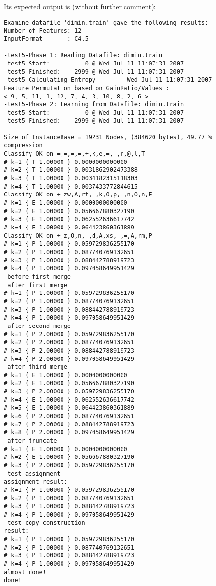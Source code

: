 \documentclass{report}
\begin{document}
Its expected output is (without further comment):

\begin{footnotesize}
\begin{verbatim}
Examine datafile 'dimin.train' gave the following results:
Number of Features: 12
InputFormat       : C4.5

-test5-Phase 1: Reading Datafile: dimin.train
-test5-Start:          0 @ Wed Jul 11 11:07:31 2007
-test5-Finished:    2999 @ Wed Jul 11 11:07:31 2007
-test5-Calculating Entropy         Wed Jul 11 11:07:31 2007
Feature Permutation based on GainRatio/Values :
< 9, 5, 11, 1, 12, 7, 4, 3, 10, 8, 2, 6 >
-test5-Phase 2: Learning from Datafile: dimin.train
-test5-Start:          0 @ Wed Jul 11 11:07:31 2007
-test5-Finished:    2999 @ Wed Jul 11 11:07:31 2007

Size of InstanceBase = 19231 Nodes, (384620 bytes), 49.77 % compression
Classify OK on =,=,=,=,+,k,e,=,-,r,@,l,T
# k=1 { T 1.00000 } 0.0000000000000
# k=2 { T 1.00000 } 0.0031862902473388
# k=3 { T 1.00000 } 0.0034182315118303
# k=4 { T 1.00000 } 0.0037433772844615
Classify OK on +,zw,A,rt,-,k,O,p,-,n,O,n,E
# k=1 { E 1.00000 } 0.0000000000000
# k=2 { E 1.00000 } 0.056667880327190
# k=3 { E 1.00000 } 0.062552636617742
# k=4 { E 1.00000 } 0.064423860361889
Classify OK on +,z,O,n,-,d,A,xs,-,=,A,rm,P
# k=1 { P 1.00000 } 0.059729836255170
# k=2 { P 1.00000 } 0.087740769132651
# k=3 { P 1.00000 } 0.088442788919723
# k=4 { P 1.00000 } 0.097058649951429
 before first merge 
 after first merge 
# k=1 { P 1.00000 } 0.059729836255170
# k=2 { P 1.00000 } 0.087740769132651
# k=3 { P 1.00000 } 0.088442788919723
# k=4 { P 1.00000 } 0.097058649951429
 after second merge 
# k=1 { P 2.00000 } 0.059729836255170
# k=2 { P 2.00000 } 0.087740769132651
# k=3 { P 2.00000 } 0.088442788919723
# k=4 { P 2.00000 } 0.097058649951429
 after third merge 
# k=1 { E 1.00000 } 0.0000000000000
# k=2 { E 1.00000 } 0.056667880327190
# k=3 { P 2.00000 } 0.059729836255170
# k=4 { E 1.00000 } 0.062552636617742
# k=5 { E 1.00000 } 0.064423860361889
# k=6 { P 2.00000 } 0.087740769132651
# k=7 { P 2.00000 } 0.088442788919723
# k=8 { P 2.00000 } 0.097058649951429
 after truncate 
# k=1 { E 1.00000 } 0.0000000000000
# k=2 { E 1.00000 } 0.056667880327190
# k=3 { P 2.00000 } 0.059729836255170
 test assignment
assignment result: 
# k=1 { P 1.00000 } 0.059729836255170
# k=2 { P 1.00000 } 0.087740769132651
# k=3 { P 1.00000 } 0.088442788919723
# k=4 { P 1.00000 } 0.097058649951429
 test copy construction
result: 
# k=1 { P 1.00000 } 0.059729836255170
# k=2 { P 1.00000 } 0.087740769132651
# k=3 { P 1.00000 } 0.088442788919723
# k=4 { P 1.00000 } 0.097058649951429
almost done!
done!
\end{verbatim}
\end{footnotesize}
\clearpage
\end{document}

